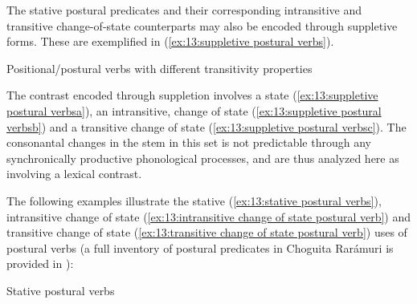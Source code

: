 The stative postural predicates and their corresponding intransitive and transitive change-of-state counterparts may also be encoded through suppletive forms. These are exemplified in (\ref{ex:13:suppletive postural verbs}).

\ea\label{ex:13:suppletive postural verbs}
{Positional/postural verbs with different transitivity properties}

    \label{ex:13:suppletive postural verbsa}
        \label{ex:13:suppletive postural verbsb}
            \label{ex:13:suppletive postural verbsc}
    \z
\z

The contrast encoded through suppletion involves a state (\ref{ex:13:suppletive postural verbsa}), an intransitive, change of state (\ref{ex:13:suppletive postural verbsb}) and a transitive change of state (\ref{ex:13:suppletive postural verbsc}). The consonantal changes in the stem in this set is not predictable through any synchronically productive phonological processes, and are thus analyzed here as involving a lexical contrast.

The following examples illustrate the stative (\ref{ex:13:stative postural verbs}), intransitive change of state (\ref{ex:13:intransitive change of state postural verb}) and transitive change of state (\ref{ex:13:transitive change of state postural verb}) uses of postural verbs (a full inventory of postural predicates in Choguita Rarámuri is provided in ):


\ea\label{ex:13:stative postural verbs}
{Stative postural verbs}\\

